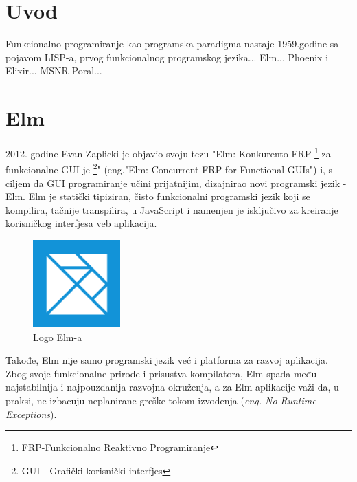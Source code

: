 \documentclass[12pt,oneside]{memoir}
\begin{document}
\frontmatter
\naslovna
\komisija
\apstrakt
\tableofcontents*

\mainmatter

\chapter{Uvod}

Funkcionalno programiranje kao programska paradigma nastaje 1959.godine sa
pojavom LISP-a, prvog funkcionalnog programskog jezika...
 Elm... Phoenix i Elixir... MSNR Poral...

\chapter{Elm}
2012. godine Evan Zaplicki je objavio svoju tezu "Elm: Konkurento FRP 
\footnote{FRP-Funkcionalno Reaktivno Programiranje} za funkcionalne GUI-je 
\footnote{GUI - Grafički korisnički interfjes }" (eng."Elm: Concurrent FRP
for Functional GUIs") \cite{elm:2012} i, s ciljem da GUI programiranje učini
prijatnijim, dizajnirao novi programski jezik - Elm.
Elm je statički tipiziran, čisto funkcionalni programski jezik koji se
kompilira, tačnije transpilira, u JavaScript i namenjen je isključivo za
kreiranje korisničkog interfjesa veb aplikacija.
\begin{figure}[!ht]
  \centering
  \includegraphics[width=0.3\textwidth]{elm.png}
  \caption{Logo Elm-a}
\end{figure}
Takođe, Elm nije samo programski jezik već i platforma za razvoj aplikacija.
Zbog svoje funkcionalne prirode i prisustva kompilatora, Elm spada među
najstabilnija i najpouzdanija razvojna okruženja, a za Elm aplikacije važi
da, u praksi, ne izbacuju neplanirane greške tokom izvođenja (\emph{eng. No Runtime Exceptions}).
\end{document}
